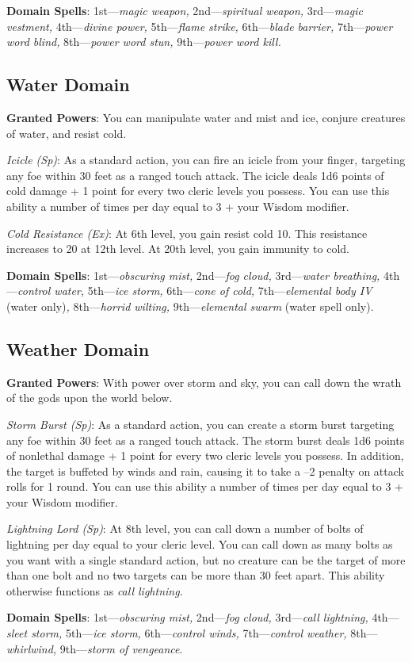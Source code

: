 \textbf{Domain Spells}: 1st---\textit{magic weapon, }2nd---\textit{spiritual weapon,} 3rd---\textit{magic vestment, }4th---\textit{divine power, }5th---\textit{flame strike, }6th---\textit{blade barrier, }7th---\textit{power word blind, }8th---\textit{power word stun, }9th---\textit{power word kill.}
				
\subsection{Water Domain}

				
\textbf{Granted Powers}: You can manipulate water and mist and ice, conjure creatures of water, and resist cold.
				
\textit{Icicle (Sp)}: As a standard action, you can fire an icicle from your finger, targeting any foe within 30 feet as a ranged touch attack. The icicle deals 1d6 points of cold damage + 1 point for every two cleric levels you possess. You can use this ability a number of times per day equal to 3 + your Wisdom modifier.
				
\textit{Cold Resistance (Ex)}: At 6th level, you gain resist cold 10. This resistance increases to 20 at 12th level. At 20th level, you gain immunity to cold.
				
\textbf{Domain Spells}: 1st---\textit{obscuring mist, }2nd---\textit{fog cloud, }3rd---\textit{water breathing, }4th---\textit{control water, }5th---\textit{ice storm, }6th---\textit{cone of cold, }7th---\textit{elemental body IV }(water only)\textit{, }8th---\textit{horrid wilting, }9th---\textit{elemental swarm }(water spell only).
				
\subsection{Weather Domain}

				
\textbf{Granted Powers}: With power over storm and sky, you can call down the wrath of the gods upon the world below.
				
\textit{Storm Burst (Sp)}: As a standard action, you can create a storm burst targeting any foe within 30 feet as a ranged touch attack. The storm burst deals 1d6 points of nonlethal damage + 1 point for every two cleric levels you possess. In addition, the target is buffeted by winds and rain, causing it to take a --2 penalty on attack rolls for 1 round. You can use this ability a number of times per day equal to 3 + your Wisdom modifier.
				
\textit{Lightning Lord (Sp)}: At 8th level, you can call down a number of bolts of lightning per day equal to your cleric level. You can call down as many bolts as you want with a single standard action, but no creature can be the target of more than one bolt and no two targets can be more than 30 feet apart. This ability otherwise functions as \textit{call lightning}.
				
\textbf{Domain Spells}: 1st---\textit{obscuring mist, }2nd---\textit{fog cloud, }3rd---\textit{call lightning, }4th---\textit{sleet storm, }5th---\textit{ice storm, }6th---\textit{control winds, }7th---\textit{control weather, }8th---\textit{whirlwind, }9th---\textit{storm of vengeance}.
        	
